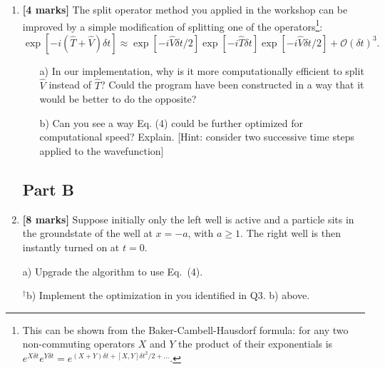 \documentclass[11pt]{article}
\begin{document}
\begin{enumerate}
\item \textbf{[4 marks]}  The split operator method you applied in the workshop can be improved by a simple modification of splitting one of the operators\footnote{This can be shown from the Baker-Cambell-Hausdorf formula: for any two non-commuting operators $X$ and $Y$ the product of their exponentials is  $e^{X\delta t }e^{Y\delta t} = e^{(X+ Y)\delta t + [X,Y]\delta t^2 /2 + \dots }$. }:
\begin{equation}
\exp\left[- i (\hat T + \hat V) \delta t  \right] \approx \exp \left[ - i \hat V \delta t/2  \right] \exp \left[ - i \hat T \delta t  \right] \exp \left[ - i \hat V \delta t/2  \right]  + \mathcal{O}(\delta t)^3.
\end{equation}
\begin{itemize}
\item[a)] In our implementation, why is it more computationally efficient to split $\hat V$ instead of $\hat T$?  Could the program have been constructed in a way that it would be better to do the opposite?
\item[b)]  Can you see a way Eq. (4) could be further optimized for computational speed? Explain. [Hint: consider two successive time steps applied to the wavefunction]
\end{itemize}

\pagebreak
\subsection*{Part B}
\item \textbf{[8 marks]}  Suppose  initially only the left well is  active and a particle sits in the groundstate of the well at $x=-a$, with $a\geq1$. The right well is then instantly turned on at $t=0$. 

\item[a)] Upgrade the algorithm to use Eq.~(4).

\item[$^\dagger$b)] Implement the optimization in you identified in Q3. b) above.   


\end{enumerate}
\end{document}

